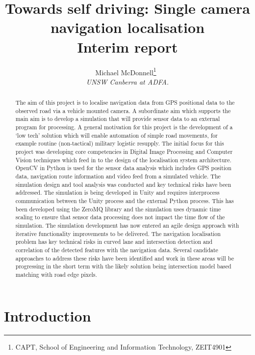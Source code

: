 \documentclass[]{aiaa-tc}%
\title{Towards self driving: Single camera navigation localisation\\ Interim report}
\author{
  Michael McDonnell\thanks{CAPT, School of Engineering and Information Technology, ZEIT4901}\
  \\
  {\normalsize\itshape
   UNSW Canberra at ADFA.}\\
  }
\begin{document}
\maketitle


\begin{abstract}
The aim of this project is to localise navigation data from GPS positional data to the observed road via a vehicle mounted camera. A subordinate aim which supports the main aim is to develop a simulation that will provide sensor data to an external program for processing. A general motivation for this project is the development of a `low tech' solution which will enable automation of simple road movements, for example routine (non-tactical) military logistic resupply. 
The initial focus for this project was developing core competencies in Digital Image Processing and Computer Vision techniques which feed in to the design of the localisation system architecture. OpenCV in Python is used for the sensor data analysis which includes GPS position data, navigation route information and video feed from a simulated vehicle.
The simulation design and tool analysis was conducted and key technical risks have been addressed. The simulation is being developed in Unity and requires interprocess communication between the Unity process and the external Python process. This has been developed using the ZeroMQ library and the simulation uses dynamic time scaling to ensure that sensor data processing does not impact the time flow of the simulation. The simulation development has now entered an agile design approach with iterative functionality improvements to be delivered.
The navigation localisation problem has key technical risks in curved lane and intersection detection and correlation of the detected features with the navigation data. Several candidate approaches to address these risks have been identified and work in these areas will be progressing in the short term with the likely solution being intersection model based matching with road edge pixels.
\end{abstract}

\newpage
\tableofcontents

\newpage
\section{Introduction} \label{sect:intro}
 
\end{document}
